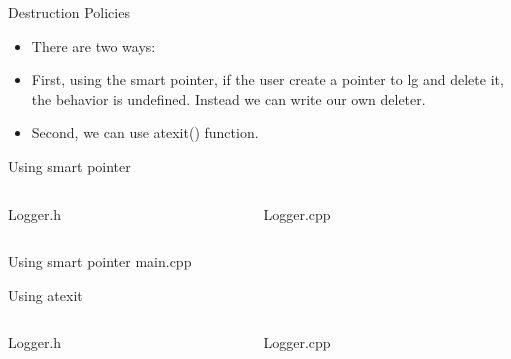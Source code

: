 \documentclass[13pt]{beamer}
\begin{document}
\begin{frame}{Destruction Policies}
\begin{itemize}
\setlength\itemsep{1em}

\item There are two ways:

\item First, using the smart pointer, if the user create a pointer to lg and delete it, the behavior is undefined. Instead we can write our own deleter.

\item Second, we can use atexit() function.
\end{itemize}
\end{frame}

\begin{frame}{Using smart pointer}
\begin{columns}[T]
\begin{column}{.48\textwidth}
Logger.h
\lstset{basicstyle=\tiny,style=myCustomCppStyle}

\end{column}

\begin{column}{.48\textwidth}
Logger.cpp
\lstset{basicstyle=\tiny,style=myCustomCppStyle}

\end{column}
\end{columns}
\end{frame}

\begin{frame}{Using smart pointer}
main.cpp
\lstset{basicstyle=\tiny,style=myCustomCppStyle}

\end{frame}

\begin{frame}{Using atexit}
\begin{columns}[T]
\begin{column}{.48\textwidth}
Logger.h
\lstset{basicstyle=\tiny,style=myCustomCppStyle}

\end{column}

\begin{column}{.48\textwidth}
Logger.cpp
\lstset{basicstyle=\tiny,style=myCustomCppStyle}

\end{column}
\end{columns}
\end{frame}
\end{document}
